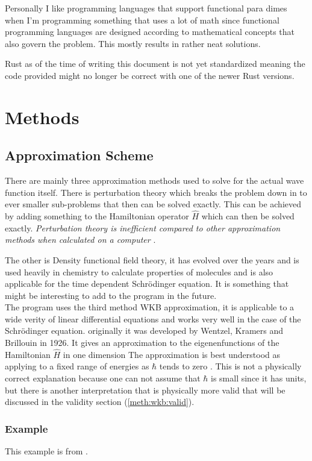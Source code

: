 \documentclass[11pt,DIV=10,final]{scrreprt} %
\begin{document}
Personally I like programming languages that support functional para dimes when I'm programming something that uses a lot of math since functional programming languages are designed according to mathematical concepts that also govern the problem. This mostly results in rather neat solutions.

Rust as of the time of writing this document is not yet standardized meaning the code provided might no longer be correct with one of the newer Rust versions.

\chapter{Methods}
\section{Approximation Scheme}
There are mainly three approximation methods used to solve for the actual wave function itself. There is perturbation theory which breaks the problem down in to ever smaller sub-problems that then can be
solved exactly. This can be achieved by adding something to the Hamiltonian operator $\hat{H}$ which can then be solved exactly. \textit{Perturbation theory is inefficient compared to other approximation
methods when calculated on a computer} \citep[Introduction]{van2014density}.

The other is Density functional field theory, it has evolved over the years and is used heavily in chemistry to calculate properties of molecules and is also applicable for the time dependent Schrödinger
equation. It is something that might be interesting to add to the program in the future.
\\

The program uses the third method WKB approximation, it is applicable to a wide verity of linear differential equations and works very well in the case of the Schrödinger equation.
originally it was developed by Wentzel, Kramers and Brillouin in 1926. It gives an approximation to the eigenenfunctions of the Hamiltonian $\hat{H}$ in one dimension The approximation is best
understood as applying to a fixed range of energies as $\hbar$ tends to zero \citep[p.~305]{hall2013quantum}. This is not a physically correct explanation because one can not assume that $\hbar$ is small since it has units, but there is another interpretation that is physically more valid that will be discussed in the validity section (\ref{meth:wkb:valid}).

\subsection{Example}
This example is from \cite[An example]{wiki:wkb}.
\end{document}
